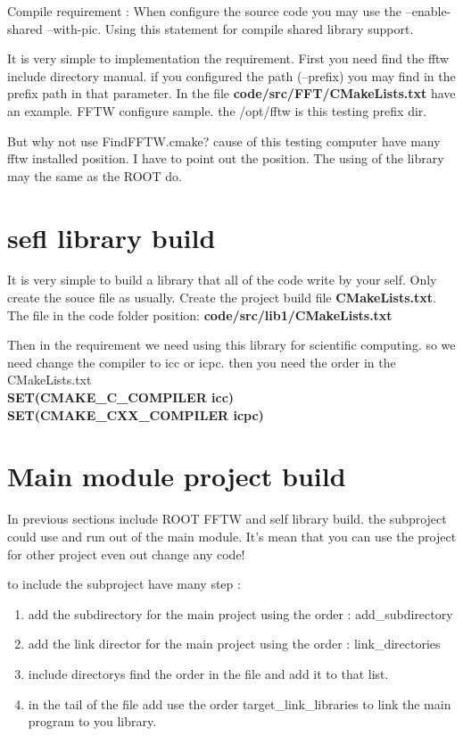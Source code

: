 \documentclass[fleqn,10pt]{SelfArx} %
\begin{document}
\begin{CJK*}{UTF8}{gbsn}
Compile requirement : When configure the source code you may use the --enable-shared --with-pic.
Using this statement for compile shared library support. 

It is very simple to implementation the requirement. 
First you need find the fftw include directory manual. if you configured the path (--prefix) you may find in the prefix path in that parameter.
In the file \textbf{code/src/FFT/CMakeLists.txt} have an example. FFTW configure sample. the /opt/fftw is this testing prefix dir.

But why not use FindFFTW.cmake? cause of this testing computer have many fftw installed position. I have to point out the position.
The using of the library may the same as the ROOT do. 

\section{sefl library build}
It is very simple to build a library that all of the code write by your self.
Only create the souce file as usually. 
Create the project build file \textbf{CMakeLists.txt}.
The file in the code folder position: \textbf{code/src/lib1/CMakeLists.txt}

Then in the requirement we need using this library for scientific computing.
so we need change the compiler to icc or icpc.
then you need the order in the CMakeLists.txt\\
\textbf{SET(CMAKE\_C\_COMPILER icc)}\\
\textbf{SET(CMAKE\_CXX\_COMPILER icpc)}\\



\section{Main module project build}

In previous sections include ROOT FFTW and self library build. the subproject could use and run out of the main module.
It's mean that you can use the project for other project even out change any code!

to include the subproject have many step :
\begin{enumerate}[noitemsep] 
\item add the subdirectory for the main project using the order : add\_subdirectory
\item add the link director for the main project using the order : link\_directories
\item include directorys find the order in the file and add it to that list.
\item in the tail of the file add use the order target\_link\_libraries to link the main program to you library.
\end{enumerate}


\end{CJK*}
\end{document}
